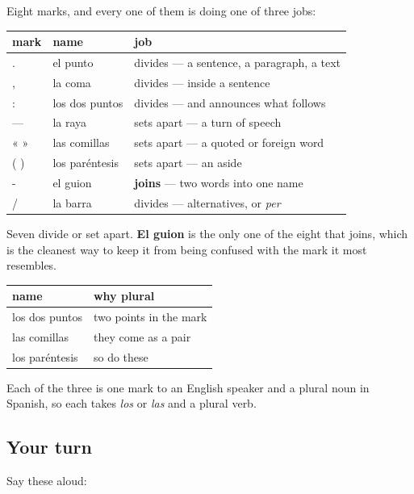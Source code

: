 \begin{grammarlens}[title={Grammar Lens: divide, join, or set apart}]
Eight marks, and every one of them is doing one of three jobs:

\noindent
\begin{tabularx}{\linewidth}{@{}>{\raggedright\arraybackslash}X>{\raggedright\arraybackslash}X>{\raggedright\arraybackslash}X@{}}
\toprule
\textbf{mark} & \textbf{name} & \textbf{job} \\
\midrule
. & el punto & divides — a sentence, a paragraph, a text \\
, & la coma & divides — inside a sentence \\
: & los dos puntos & divides — and announces what follows \\
— & la raya & sets apart — a turn of speech \\
« » & las comillas & sets apart — a quoted or foreign word \\
( ) & los paréntesis & sets apart — an aside \\
- & el guion & \textbf{joins} — two words into one name \\
/ & la barra & divides — alternatives, or \emph{per} \\
\bottomrule
\end{tabularx}

Seven divide or set apart. \textbf{El guion} is the only one of the eight that joins, which is the cleanest way to keep it from being confused with the mark it most resembles.
\end{grammarlens}

\begin{grammarlens}[title={Grammar Lens: the three with plural names}]
\noindent
\begin{tabularx}{\linewidth}{@{}>{\raggedright\arraybackslash}X>{\raggedright\arraybackslash}X@{}}
\toprule
\textbf{name} & \textbf{why plural} \\
\midrule
los dos puntos & two points in the mark \\
las comillas & they come as a pair \\
los paréntesis & so do these \\
\bottomrule
\end{tabularx}

Each of the three is one mark to an English speaker and a plural noun in Spanish, so each takes \emph{los} or \emph{las} and a plural verb.
\end{grammarlens}

\subsection*{Your turn}
Say these aloud:


